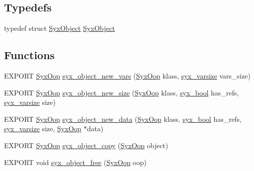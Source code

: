 \subsection*{Typedefs}
\begin{CompactItemize}
\item 
typedef struct \hyperlink{struct_syx_object}{SyxObject} \hyperlink{syx-object_8h_1bd7e679e4563ab6afb40a4ab1ccab7d}{SyxObject}
\end{CompactItemize}
\subsection*{Functions}
\begin{CompactItemize}
\item 
EXPORT \hyperlink{syx-types_8h_1121caba2d40b2ce090b640762744ccd}{SyxOop} \hyperlink{syx-object_8h_2ad72ae9f822633bd80b9960fb758961}{syx\_\-object\_\-new\_\-vars} (\hyperlink{syx-types_8h_1121caba2d40b2ce090b640762744ccd}{SyxOop} klass, \hyperlink{syx-types_8h_18e1a1417591a1efb670b97ce320f535}{syx\_\-varsize} vars\_\-size)
\item 
EXPORT \hyperlink{syx-types_8h_1121caba2d40b2ce090b640762744ccd}{SyxOop} \hyperlink{syx-object_8h_df2f65814fe225be62a0cc96b5570d15}{syx\_\-object\_\-new\_\-size} (\hyperlink{syx-types_8h_1121caba2d40b2ce090b640762744ccd}{SyxOop} klass, \hyperlink{syx-types_8h_c6dc09b276b99fa1956364359139daab}{syx\_\-bool} has\_\-refs, \hyperlink{syx-types_8h_18e1a1417591a1efb670b97ce320f535}{syx\_\-varsize} size)
\item 
EXPORT \hyperlink{syx-types_8h_1121caba2d40b2ce090b640762744ccd}{SyxOop} \hyperlink{syx-object_8h_4c50454bad3dd39c9e137207f870a2dc}{syx\_\-object\_\-new\_\-data} (\hyperlink{syx-types_8h_1121caba2d40b2ce090b640762744ccd}{SyxOop} klass, \hyperlink{syx-types_8h_c6dc09b276b99fa1956364359139daab}{syx\_\-bool} has\_\-refs, \hyperlink{syx-types_8h_18e1a1417591a1efb670b97ce320f535}{syx\_\-varsize} size, \hyperlink{syx-types_8h_1121caba2d40b2ce090b640762744ccd}{SyxOop} $\ast$data)
\item 
EXPORT \hyperlink{syx-types_8h_1121caba2d40b2ce090b640762744ccd}{SyxOop} \hyperlink{syx-object_8h_4495a25fcf21daa1fff65760198a6f0c}{syx\_\-object\_\-copy} (\hyperlink{syx-types_8h_1121caba2d40b2ce090b640762744ccd}{SyxOop} object)
\item 
EXPORT void \hyperlink{syx-object_8h_1183dd2393eabdaf754948e182dcb287}{syx\_\-object\_\-free} (\hyperlink{syx-types_8h_1121caba2d40b2ce090b640762744ccd}{SyxOop} oop)
\item 

\end{CompactItemize}
